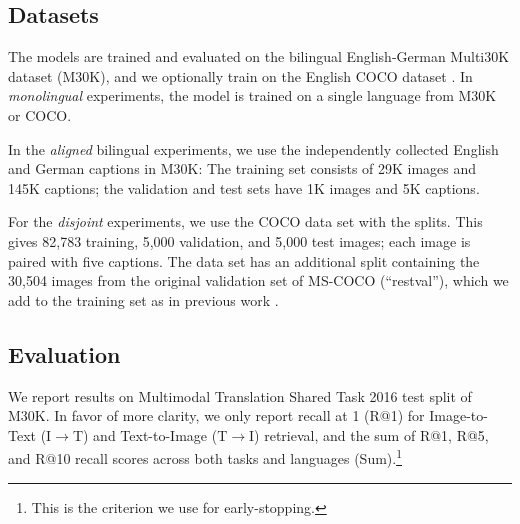 \subsection{Datasets}

The models are trained and evaluated on the bilingual English-German Multi30K dataset (M30K), and we
optionally train on the English COCO dataset 
\citep{DBLP:journals/corr/ChenFLVGDZ15}. In \textit{monolingual} 
experiments, the model is trained on a single language from M30K or 
COCO.

In the \emph{aligned} bilingual experiments, we use the
independently collected English and German captions in M30K:
The training set consists of 29K images and 145K captions; the validation and test sets have 1K images and 5K captions. 

For the \emph{disjoint} experiments, we use the COCO data set
with the \cite{karpathy2015deep} splits. This gives 82,783 training,
5,000 validation, and 5,000 test images; each image is paired with five captions.
The data set has an additional split containing the  
30,504 images from the original validation set of 
MS-COCO (``restval''),
 which we add to the training set as in previous work \citep{karpathy2015deep,vendrov2016order,faghri2017vse++}.
 


\subsection{Evaluation}
We report results on Multimodal Translation Shared Task 2016 test split \citep{specia2016shared} of M30K. 
In favor of more clarity, we only report recall at 1 (R@1) for 
Image-to-Text (I$\rightarrow$T) and Text-to-Image (T$\rightarrow$I)
retrieval, and the sum of R@1, R@5, and R@10 recall scores across both tasks and languages (Sum).\footnote{This is the criterion we use
for early-stopping.}

